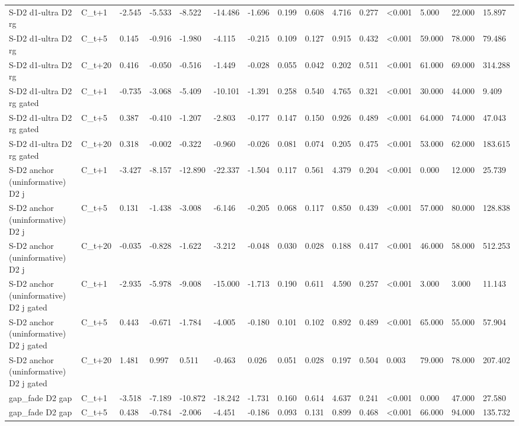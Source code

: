 \begin{tabular}{lllllllllllllll}
S-D2 d1-ultra D2 rg & C\_t+1 & -2.545 & -5.533 & -8.522 & -14.486 & -1.696 & 0.199 & 0.608 & 4.716 & 0.277 & <0.001 & 5.000 & 22.000 & 15.897 \\
S-D2 d1-ultra D2 rg & C\_t+5 & 0.145 & -0.916 & -1.980 & -4.115 & -0.215 & 0.109 & 0.127 & 0.915 & 0.432 & <0.001 & 59.000 & 78.000 & 79.486 \\
S-D2 d1-ultra D2 rg & C\_t+20 & 0.416 & -0.050 & -0.516 & -1.449 & -0.028 & 0.055 & 0.042 & 0.202 & 0.511 & <0.001 & 61.000 & 69.000 & 314.288 \\
S-D2 d1-ultra D2 rg gated & C\_t+1 & -0.735 & -3.068 & -5.409 & -10.101 & -1.391 & 0.258 & 0.540 & 4.765 & 0.321 & <0.001 & 30.000 & 44.000 & 9.409 \\
S-D2 d1-ultra D2 rg gated & C\_t+5 & 0.387 & -0.410 & -1.207 & -2.803 & -0.177 & 0.147 & 0.150 & 0.926 & 0.489 & <0.001 & 64.000 & 74.000 & 47.043 \\
S-D2 d1-ultra D2 rg gated & C\_t+20 & 0.318 & -0.002 & -0.322 & -0.960 & -0.026 & 0.081 & 0.074 & 0.205 & 0.475 & <0.001 & 53.000 & 62.000 & 183.615 \\
S-D2 anchor (uninformative) D2 j & C\_t+1 & -3.427 & -8.157 & -12.890 & -22.337 & -1.504 & 0.117 & 0.561 & 4.379 & 0.204 & <0.001 & 0.000 & 12.000 & 25.739 \\
S-D2 anchor (uninformative) D2 j & C\_t+5 & 0.131 & -1.438 & -3.008 & -6.146 & -0.205 & 0.068 & 0.117 & 0.850 & 0.439 & <0.001 & 57.000 & 80.000 & 128.838 \\
S-D2 anchor (uninformative) D2 j & C\_t+20 & -0.035 & -0.828 & -1.622 & -3.212 & -0.048 & 0.030 & 0.028 & 0.188 & 0.417 & <0.001 & 46.000 & 58.000 & 512.253 \\
S-D2 anchor (uninformative) D2 j gated & C\_t+1 & -2.935 & -5.978 & -9.008 & -15.000 & -1.713 & 0.190 & 0.611 & 4.590 & 0.257 & <0.001 & 3.000 & 3.000 & 11.143 \\
S-D2 anchor (uninformative) D2 j gated & C\_t+5 & 0.443 & -0.671 & -1.784 & -4.005 & -0.180 & 0.101 & 0.102 & 0.892 & 0.489 & <0.001 & 65.000 & 55.000 & 57.904 \\
S-D2 anchor (uninformative) D2 j gated & C\_t+20 & 1.481 & 0.997 & 0.511 & -0.463 & 0.026 & 0.051 & 0.028 & 0.197 & 0.504 & 0.003 & 79.000 & 78.000 & 207.402 \\
gap\_fade D2 gap & C\_t+1 & -3.518 & -7.189 & -10.872 & -18.242 & -1.731 & 0.160 & 0.614 & 4.637 & 0.241 & <0.001 & 0.000 & 47.000 & 27.580 \\
gap\_fade D2 gap & C\_t+5 & 0.438 & -0.784 & -2.006 & -4.451 & -0.186 & 0.093 & 0.131 & 0.899 & 0.468 & <0.001 & 66.000 & 94.000 & 135.732 \\

\end{tabular}
